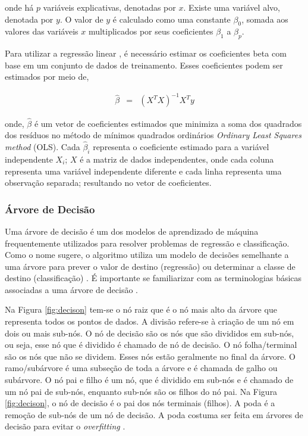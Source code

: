  \noindent onde há $p$ variáveis explicativas, denotadas por $x$. Existe uma variável alvo, denotada por $y$. O valor de $y$ é calculado como uma constante $\beta_0$, somada aos valores das variáveis $x$ multiplicados por seus coeficientes $\beta_1$ a $\beta_p$.
 
 
 Para utilizar a regressão linear \cite{korstanje2021}, é necessário estimar os coeficientes beta com base em um conjunto de dados de treinamento. Esses coeficientes podem ser estimados por meio de,
 
 \begin{eqnarray}
 	\hat{\beta}&=&\left(X^T X\right)^{-1} X^T y\label{eq:ols}
 \end{eqnarray}
 
 \noindent onde, $\hat{\beta}$ é um vetor de coeficientes estimados que minimiza a soma dos quadrados dos resíduos no método de mínimos quadrados ordinários  \textit{Ordinary Least Squares method} (OLS). Cada $\hat{\beta}_i$ representa o coeficiente estimado para a variável independente $X_i$;
 $X$ é a matriz de dados independentes, onde cada coluna representa uma variável independente diferente e cada linha representa uma observação separada;
 resultando no vetor de coeficientes.
 
 
 \subsubsection{\'Arvore de Decis\~ao}
 
 Uma árvore de decisão é um dos modelos de aprendizado de máquina frequentemente utilizados para resolver problemas de regressão e classificação. Como o nome sugere, o algoritmo utiliza um modelo de decisões semelhante a uma árvore para prever o valor de destino (regressão) ou determinar a classe de destino (classificação) \cite{SHI2023110022}. É importante se familiarizar com as terminologias básicas associadas a uma árvore de decisão \cite{SINGHKUSHWAH20223571}.
 
 Na Figura \ref{fig:decison} tem-se o nó raiz que é o nó mais alto da árvore que representa todos os pontos de dados. A divisão refere-se à criação de um nó em dois ou mais sub-nós.
 O nó de decisão são os nós que são divididos em sub-nós, ou seja, esse nó que é dividido é chamado de nó de decisão. O nó folha/terminal são os nós que não se dividem. Esses nós estão geralmente no final da árvore. O ramo/subárvore é uma subseção de toda a árvore e é chamada de galho ou subárvore. O nó pai e filho é um nó, que é dividido em sub-nós e é chamado de um nó pai de sub-nós, enquanto sub-nós são os filhos do nó pai. Na Figura \ref{fig:decison}, o nó de decisão é o pai dos nós terminais (filhos).
 A poda é a remoção de sub-nós de um nó de decisão. A poda costuma ser feita em árvores de decisão para evitar o \textit{overfitting}  \cite{decision}.
 
